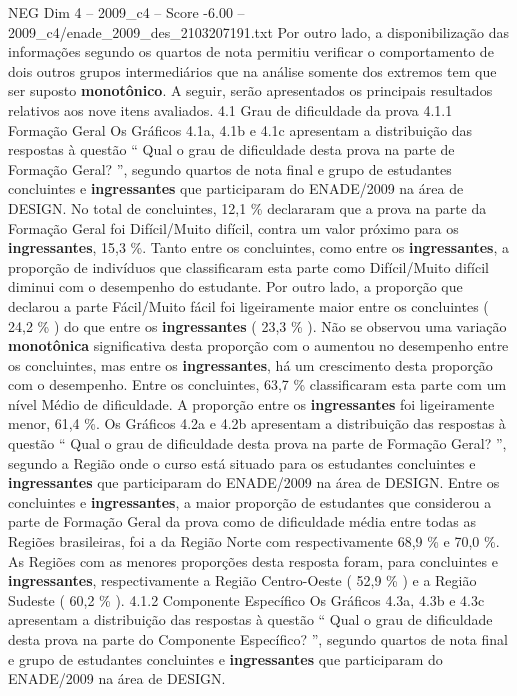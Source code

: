 \begin{textsample}{NEG Dim 4 – 2009\_c4 – Score -6.00 – 2009\_c4/enade\_2009\_des\_2103207191.txt}
Por outro lado, a disponibilização das informações segundo os quartos de nota permitiu verificar o comportamento de dois outros grupos intermediários que na análise somente dos extremos tem que ser suposto \textbf{monotônico}.
A seguir, serão apresentados os principais resultados relativos aos nove itens avaliados. 4.1 Grau de dificuldade da prova 4.1.1 Formação Geral Os Gráficos 4.1a, 4.1b e 4.1c apresentam a distribuição das respostas à questão “ Qual o grau de dificuldade desta prova na parte de Formação Geral? ”, segundo quartos de nota final e grupo de estudantes concluintes e \textbf{ingressantes} que participaram do ENADE/2009 na área de DESIGN.
No total de concluintes, 12,1 \% declararam que a prova na parte da Formação Geral foi Difícil/Muito difícil, contra um valor próximo para os \textbf{ingressantes}, 15,3 \%.
Tanto entre os concluintes, como entre os \textbf{ingressantes}, a proporção de indivíduos que classificaram esta parte como Difícil/Muito difícil diminui com o desempenho do estudante.
Por outro lado, a proporção que declarou a parte Fácil/Muito fácil foi ligeiramente maior entre os concluintes ( 24,2 \% ) do que entre os \textbf{ingressantes} ( 23,3 \% ).
Não se observou uma variação \textbf{monotônica} significativa desta proporção com o aumentou no desempenho entre os concluintes, mas entre os \textbf{ingressantes}, há um crescimento desta proporção com o desempenho.
Entre os concluintes, 63,7 \% classificaram esta parte com um nível Médio de dificuldade.
A proporção entre os \textbf{ingressantes} foi ligeiramente menor, 61,4 \%.
Os Gráficos 4.2a e 4.2b apresentam a distribuição das respostas à questão “ Qual o grau de dificuldade desta prova na parte de Formação Geral? ”, segundo a Região onde o curso está situado para os estudantes concluintes e \textbf{ingressantes} que participaram do ENADE/2009 na área de DESIGN.
Entre os concluintes e \textbf{ingressantes}, a maior proporção de estudantes que considerou a parte de Formação Geral da prova como de dificuldade média entre todas as Regiões brasileiras, foi a da Região Norte com respectivamente 68,9 \% e 70,0 \%.
As Regiões com as menores proporções desta resposta foram, para concluintes e \textbf{ingressantes}, respectivamente a Região Centro-Oeste ( 52,9 \% ) e a Região Sudeste ( 60,2 \% ). 4.1.2 Componente Específico Os Gráficos 4.3a, 4.3b e 4.3c apresentam a distribuição das respostas à questão “ Qual o grau de dificuldade desta prova na parte do Componente Específico? ”, segundo quartos de nota final e grupo de estudantes concluintes e \textbf{ingressantes} que participaram do ENADE/2009 na área de DESIGN.

\end{textsample}
